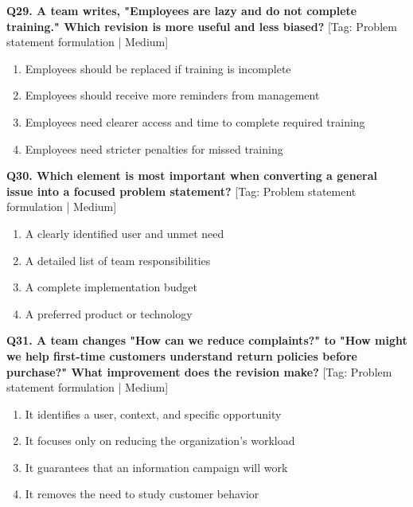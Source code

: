 \noindent\textbf{Q29. A team writes, "Employees are lazy and do not complete training." Which revision is more useful and less biased?} \hfill [Tag: Problem statement formulation | Medium]
\begin{enumerate}[label=(\alph*),topsep=2pt,itemsep=1pt,partopsep=0pt,parsep=0pt]
    \item {Employees should be replaced if training is incomplete}
    \item {Employees should receive more reminders from management}
    \item {Employees need clearer access and time to complete required training}
    \item {Employees need stricter penalties for missed training}
\end{enumerate}
\vspace{2mm}

\noindent\textbf{Q30. Which element is most important when converting a general issue into a focused problem statement?} \hfill [Tag: Problem statement formulation | Medium]
\begin{enumerate}[label=(\alph*),topsep=2pt,itemsep=1pt,partopsep=0pt,parsep=0pt]
    \item {A clearly identified user and unmet need}
    \item {A detailed list of team responsibilities}
    \item {A complete implementation budget}
    \item {A preferred product or technology}
\end{enumerate}
\vspace{2mm}

\noindent\textbf{Q31. A team changes "How can we reduce complaints?" to "How might we help first-time customers understand return policies before purchase?" What improvement does the revision make?} \hfill [Tag: Problem statement formulation | Medium]
\begin{enumerate}[label=(\alph*),topsep=2pt,itemsep=1pt,partopsep=0pt,parsep=0pt]
    \item {It identifies a user, context, and specific opportunity}
    \item {It focuses only on reducing the organization's workload}
    \item {It guarantees that an information campaign will work}
    \item {It removes the need to study customer behavior}
\end{enumerate}
\vspace{2mm}

